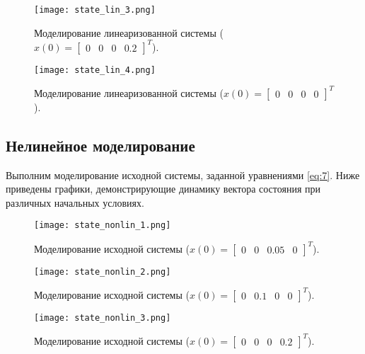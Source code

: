 \begin{figure}[]
    \centering
    \texttt{[image: state\_lin\_3.png]}
    \caption{\label{fig:task2_3_3}Моделирование линеаризованной системы ($x(0)=\begin{bmatrix}
        0 & 0 & 0 & 0.2
    \end{bmatrix}^T$).}
\end{figure}

\begin{figure}[]
    \centering
    \texttt{[image: state\_lin\_4.png]}
    \caption{\label{fig:task2_3_4}Моделирование линеаризованной системы ($x(0)=\begin{bmatrix}
        0 & 0 & 0 & 0
    \end{bmatrix}^T$).}
\end{figure}

\subsection{Нелинейное моделирование}
Выполним моделирование исходной системы, заданной уравнениями \ref{eq:7}.
Ниже приведены графики, демонстрирующие динамику вектора состояния при различных начальных условиях.

\begin{figure}[]
    \centering
    \texttt{[image: state\_nonlin\_1.png]}
    \caption{\label{fig:task2_4_1}Моделирование исходной системы ($x(0)=\begin{bmatrix}
        0 & 0 & 0.05 & 0
    \end{bmatrix}^T$).}
\end{figure}

\begin{figure}[]
    \centering
    \texttt{[image: state\_nonlin\_2.png]}
    \caption{\label{fig:task2_4_2}Моделирование исходной системы ($x(0)=\begin{bmatrix}
        0 & 0.1 & 0 & 0
    \end{bmatrix}^T$).}
\end{figure}

\begin{figure}[]
    \centering
    \texttt{[image: state\_nonlin\_3.png]}
    \caption{\label{fig:task2_4_3}Моделирование исходной системы ($x(0)=\begin{bmatrix}
        0 & 0 & 0 & 0.2
    \end{bmatrix}^T$).}
\end{figure}

